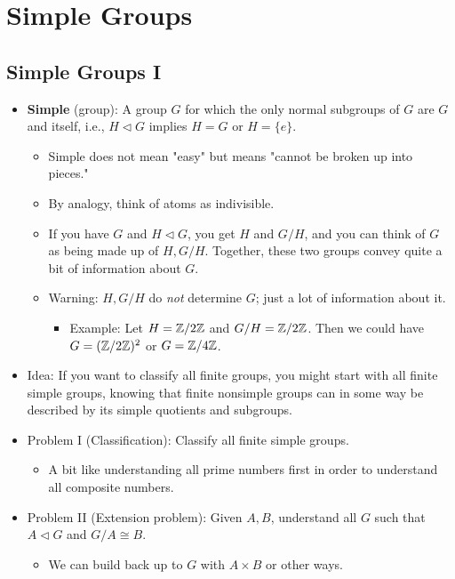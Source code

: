 \documentclass[../notes.tex]{subfiles}
\begin{document}
\chapter{Simple Groups}
\section{Simple Groups I}
\begin{itemize}
    \item {}\textbf{Simple} (group): A group $G$ for which the only normal subgroups of $G$ are $G$ and itself, i.e., $H\triangleleft G$ implies $H=G$ or $H=\{e\}$.
    \begin{itemize}
        \item Simple does not mean "easy" but means "cannot be broken up into pieces."
        \item By analogy, think of atoms as indivisible.
        \item If you have $G$ and $H\triangleleft G$, you get $H$ and $G/H$, and you can think of $G$ as being made up of $H,G/H$. Together, these two groups convey quite a bit of information about $G$.
        \item Warning: $H,G/H$ do \emph{not} determine $G$; just a lot of information about it.
        \begin{itemize}
            \item Example: Let $H=\mathbb{Z}/2\mathbb{Z}$ and $G/H=\mathbb{Z}/2\mathbb{Z}$. Then we could have $G=(\mathbb{Z}/2\mathbb{Z})^2$ or $G=\mathbb{Z}/4\mathbb{Z}$.
        \end{itemize}
    \end{itemize}
    \item Idea: If you want to classify all finite groups, you might start with all finite simple groups, knowing that finite nonsimple groups can in some way be described by its simple quotients and subgroups.
    \item Problem I (Classification): Classify all finite simple groups.
    \begin{itemize}
        \item A bit like understanding all prime numbers first in order to understand all composite numbers.
    \end{itemize}
    \item Problem II (Extension problem): Given $A,B$, understand all $G$ such that $A\triangleleft G$ and $G/A\cong B$.
    \begin{itemize}
        \item We can build back up to $G$ with $A\times B$ or other ways.

\end{itemize}
\end{itemize}
\end{document}
